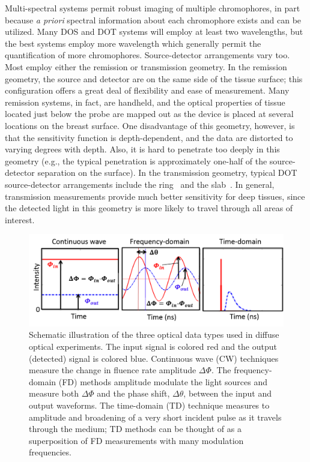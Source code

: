 Multi-spectral systems permit robust imaging of multiple chromophores, in part because \textit{a priori} spectral information about each chromophore exists and can be utilized. Many DOS and DOT systems will employ at least two wavelengths, but the best systems employ more wavelength which generally permit the quantification of more chromophores. Source-detector arrangements vary too. Most employ either the remission or transmission geometry. In the remission geometry, the source and detector are on the same side of the tissue surface; this configuration offers a great deal of flexibility and ease of measurement. Many remission systems, in fact, are handheld, and the optical properties of tissue located just below the probe are mapped out as the device is placed at several locations on the breast surface. One disadvantage of this geometry, however, is that the sensitivity function is depth-dependent, and the data are distorted to varying degrees with depth. Also, it is hard to penetrate too deeply in this geometry (e.g., the typical penetration is approximately one-half of the source-detector separation on the surface). In the transmission geometry, typical DOT source-detector arrangements include the ring~\cite{Pogue1995,Nioka1997,Poplack2007,Enfield2007} and the slab~\cite{Grosenick2005,Pifferi2003,Choe2009}. In general, transmission measurements provide much better sensitivity for deep tissues, since the detected light in this geometry is more likely to travel through all areas of interest.
\begin{figure}[t]
\centering
\includegraphics[width=14.5cm]{./figures/1_Introduction/detscheme.png}
\caption[Schematic illustration of the three optical data types used in diffuse optics]{Schematic illustration of the three optical data types used in diffuse optical experiments. The input signal is colored red and the output (detected) signal is colored blue. Continuous wave (CW) techniques measure the change in fluence rate amplitude $\Delta\Phi$. The frequency-domain (FD) methods amplitude modulate the light sources and measure both $\Delta\Phi$ and the phase shift, $\Delta\theta$, between the input and output waveforms. The time-domain (TD) technique measures to amplitude and broadening of a very short incident pulse as it travels through the medium; TD methods can be thought of as a superposition of FD measurements with many modulation frequencies.}
\label{fig:detscheme}
\end{figure}

